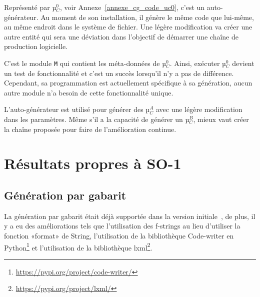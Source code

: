 Représenté par µ$_C^0$, voir Annexe~\ref{annexe_cg_code_uc0}, c’est un auto-générateur. Au moment de son installation, il génère le même code que lui-même, au même endroit dans le système de fichier. Une légère modification va créer une autre entité qui sera une déviation dans l’objectif de démarrer une chaîne de production logicielle.

C'est le module \texttt{M} qui contient les méta-données de µ$_C^0$. Ainsi, exécuter µ$_C^0$ devient un test de fonctionnalité et c'est un succès lorsqu'il n'y a pas de différence. Cependant, sa programmation est actuellement spécifique à sa génération, aucun autre module n’a besoin de cette fonctionnalité unique.




L'auto-générateur est utilisé pour générer des µ$_C^A$ avec une légère modification dans les paramètres. Même s'il a la capacité de générer un µ$_C^B$, mieux vaut créer la chaîne proposée pour faire de l'amélioration continue.

\section{Résultats propres à SO-1}

\subsection{Génération par gabarit}

La génération par gabarit était déjà supportée dans la version initiale~\cite{bluiksnot_repo}, de plus, il y a eu des améliorations tels que l'utilisation des f-strings au lieu d'utiliser la fonction «format» de String, l'utilisation de la bibliothèque Code-writer en Python\footnote{\url{https://pypi.org/project/code-writer/}} et l'utilisation de la bibliothèque lxml\footnote{\url{https://pypi.org/project/lxml/}}.

